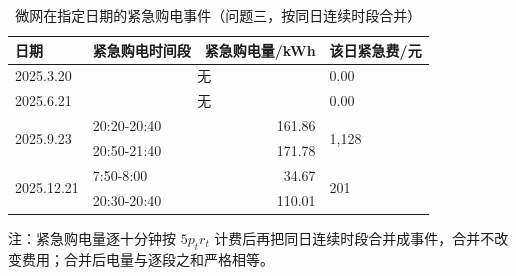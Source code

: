 \begin{table}[htbp]
  \centering
  \caption{微网在指定日期的紧急购电事件（问题三，按同日连续时段合并）}
  \label{tab:p3-emg}
  \small
  \begin{tabular}{llrl}
    \toprule
    日期 & 紧急购电时间段 & 紧急购电量/kWh & 该日紧急费/元 \\
    \midrule
    2025.3.20 & \multicolumn{2}{c}{无} & 0.00 \\
    \midrule
    2025.6.21 & \multicolumn{2}{c}{无} & 0.00 \\
    \midrule
    \multirow{2}{*}{2025.9.23} & 20{:}20-20{:}40 & 161.86 & \multirow{2}{*}{1,128} \\
     & 20{:}50-21{:}40 & 171.78 & \\
    \midrule
    \multirow{2}{*}{2025.12.21} & 7{:}50-8{:}00 & 34.67 & \multirow{2}{*}{201} \\
     & 20{:}30-20{:}40 & 110.01 & \\
    \bottomrule
  \end{tabular}
  \par\vspace{2pt}
  \begin{minipage}{\textwidth}\footnotesize
    注：紧急购电量逐十分钟按 $5p_tr_t$ 计费后再把同日连续时段合并成事件，合并不改变费用；合并后电量与逐段之和严格相等。
  \end{minipage}
\end{table}
